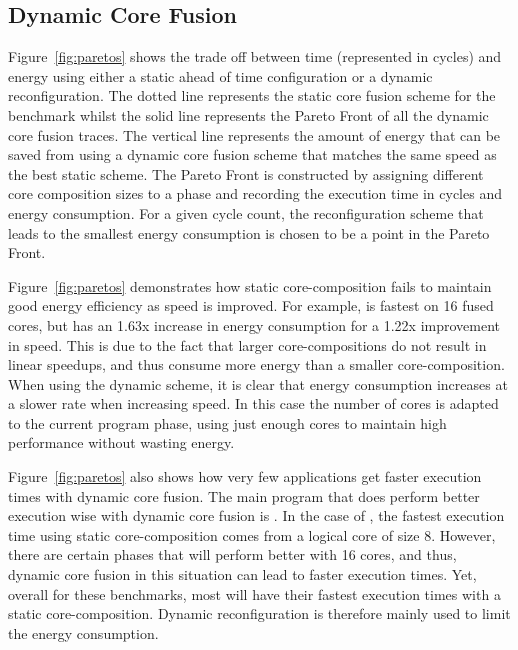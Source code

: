 \subsection{Dynamic Core Fusion}
Figure~\ref{fig:paretos} shows the trade off between time (represented in cycles) and energy using either a static ahead of time configuration or a dynamic reconfiguration.
The dotted line represents the static core fusion scheme for the benchmark whilst the solid line represents the Pareto Front of all the dynamic core fusion traces.
The vertical line represents the amount of energy that can be saved from using a dynamic core fusion scheme that matches the same speed as the best static scheme.
The Pareto Front is constructed by assigning different core composition sizes to a phase and recording the execution time in cycles and energy consumption.
For a given cycle count, the reconfiguration scheme that leads to the smallest energy consumption is chosen to be a point in the Pareto Front.

Figure~\ref{fig:paretos} demonstrates how static core-composition fails to maintain good energy efficiency as speed is improved.
For example,  is fastest on 16 fused cores, but has an 1.63x increase in energy consumption for a 1.22x improvement in speed.
This is due to the fact that larger core-compositions do not result in linear speedups, and thus consume more energy than a smaller core-composition.
When using the dynamic scheme, it is clear that energy consumption increases at a slower rate when increasing speed.
In this case the number of cores is adapted to the current program phase, using just enough cores to maintain high performance without wasting energy.

Figure~\ref{fig:paretos} also shows how very few applications get faster execution times with dynamic core fusion.
The main program that does perform better execution wise with dynamic core fusion is .
In the case of , the fastest execution time using static core-composition comes from a logical core of size 8.
However, there are certain phases that will perform better with 16 cores, and thus, dynamic core fusion in this situation can lead to faster execution times.
Yet, overall for these benchmarks, most will have their fastest execution times with a static core-composition.
Dynamic reconfiguration is therefore mainly used to limit the energy consumption.

